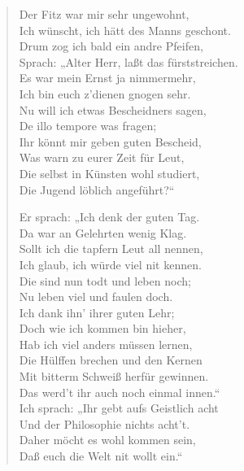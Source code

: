 \begin{verse}
Der Fitz war mir sehr ungewohnt,\\
Ich wünscht, ich hätt des Manns geschont.\\
Drum zog ich bald ein andre Pfeifen,\\
Sprach: „Alter Herr, laßt das fürststreichen.\\
Es war mein Ernst ja nimmermehr,\\
Ich bin euch z’dienen gnogen sehr.\\
Nu will ich etwas Bescheidners sagen,\\
De illo tempore was fragen;\\
Ihr könnt mir geben guten Bescheid,\\
Was warn zu eurer Zeit für Leut,\\
Die selbst in Künsten wohl studiert,\\
Die Jugend löblich angeführt?“

Er sprach: „Ich denk der guten Tag.\\
Da war an Gelehrten wenig Klag.\\
Sollt ich die tapfern Leut all nennen,\\
Ich glaub, ich würde viel nit kennen.\\
Die sind nun todt und leben noch;\\
Nu leben viel und faulen doch.\\
Ich dank ihn’ ihrer guten Lehr;\\
Doch wie ich kommen bin hieher,\\
Hab ich viel anders müssen lernen,\\
Die Hülffen brechen und den Kernen\\
Mit bitterm Schweiß herfür gewinnen.\\
Das werd’t ihr auch noch einmal innen.“\\
Ich sprach: „Ihr gebt aufs Geistlich acht\\
Und der Philosophie nichts acht’t.\\
Daher möcht es wohl kommen sein,\\
Daß euch die Welt nit wollt ein.“


\end{verse}
